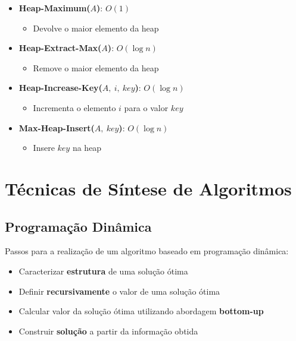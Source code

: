 \documentclass[11pt]{article}
\begin{document}
\begin{itemize}[topsep=0pt]
    \item \textbf{Heap-Maximum($A$)}: $O(1)$
          \begin{itemize}[topsep=0pt]
              \item Devolve o maior elemento da heap
          \end{itemize}
    \item \textbf{Heap-Extract-Max($A$)}: $O(\log n)$
          \begin{itemize}[topsep=0pt]
              \item Remove o maior elemento da heap
          \end{itemize}
    \item \textbf{Heap-Increase-Key($A,\ i ,\ key$)}: $O(\log n)$
          \begin{itemize}[topsep=0pt]
              \item Incrementa o elemento $i$ para o valor $key$
          \end{itemize}
    \item \textbf{Max-Heap-Insert($A,\ key$)}: $O(\log n)$
          \begin{itemize}[topsep=0pt]
              \item Insere $key$ na heap
          \end{itemize}
\end{itemize}

\newpage

\setcounter{section}{3}

\section{Técnicas de Síntese de Algoritmos}

\subsection{Programação Dinâmica} 

Passos para a realização de um algoritmo baseado em programação dinâmica:
\begin{itemize}[topsep=0pt]
    \item Caracterizar \textbf{estrutura} de uma solução ótima
    \item Definir \textbf{recursivamente} o valor de uma solução ótima
    \item Calcular valor da solução ótima utilizando abordagem \textbf{bottom-up}
    \item Construir \textbf{solução} a partir da informação obtida
\end{itemize}
\end{document}
